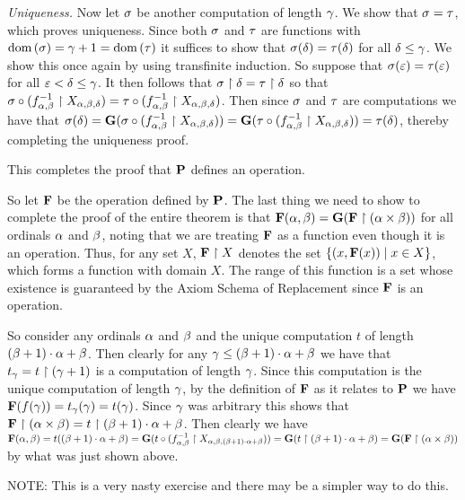 {{    \emph{Uniqueness.} Now let $\s$ be another computation of length $\g$.
    We show that $\s = \t$, which proves uniqueness.
    Since both $\s$ and $\t$ are functions with $\dom(\s) = \g+1 = \dom(\t)$ it suffices to show that $\s(\d) = \t(\d)$ for all $\d \leq \g$.
    We show this once again by using transfinite induction.
    So suppose that $\s(\e) = \t(\e)$ for all $\e < \d \leq \g$.
    It then follows that $\s \rest \d = \t \rest \d$ so that $\s \circ (\inv{f_{\a,\b}} \rest X_{\a,\b,\d}) = \t \circ (\inv{f_{\a,\b}} \rest X_{\a,\b,\d})$.
    Then since $\s$ and $\t$ are computations we have that $\s(\d) = \G(\s \circ (\inv{f_{\a,\b}} \rest X_{\a,\b,\d})) = \G(\t \circ (\inv{f_{\a,\b}} \rest X_{\a,\b,\d})) = \t(\d)$, thereby completing the uniqueness proof.

    This completes the proof that $\P$ defines an operation.

    So let $\F$ be the operation defined by $\P$.
    The last thing we need to show to complete the proof of the entire theorem is that $\F(\a, \b) = \G(\F \rest (\a \times \b))$ for all ordinals $\a$ and $\b$, noting that we are treating $\F$ as a function even though it is an operation.
    Thus, for any set $X$, $\F \rest X$ denotes the set $\braces{(x, \F(x)) \where x \in X}$, which forms a function with domain $X$.
    The range of this function is a set whose existence is guaranteed by the Axiom Schema of Replacement since $\F$ is an operation.

    So consider any ordinals $\a$ and $\b$ and the unique computation $t$ of length $(\b+1)\cdot\a + \b$.
    Then clearly for any $\g \leq (\b+1)\cdot\a + \b$ we have that $t_\g = t \rest (\g+1)$ is a computation of length $\g$.
    Since this computation is the unique computation of length $\g$, by the definition of $\F$ as it relates to $\P$ we have $\F(f(\g)) = t_\g(\g) = t(\g)$.
    Since $\g$ was arbitrary this shows that $\F \rest (\a \times \b) = t \rest (\b+1)\cdot\a + \b$.
    Then clearly we have $\F(\a, \b) = t((\b+1)\cdot\a + \b) = \G(t \circ (\inv{f_{\a,\b}} \rest X_{\a,\b,(\b+1)\cdot\a + \b})) = \G(t \rest (\b+1)\cdot\a + \b) = \G(\F \rest (\a \times \b))$ by what was just shown above.
  }

  NOTE: This is a very nasty exercise and there may be a simpler way to do this.
}

